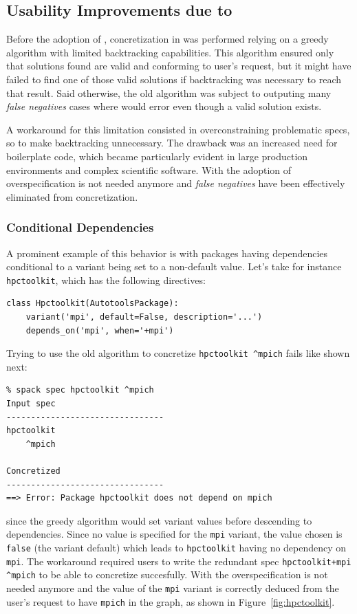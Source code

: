 \subsection{Usability Improvements due to \clingo}
Before the adoption of \clingo, concretization in \spack{} was performed relying on a greedy algorithm with limited backtracking capabilities. This algorithm ensured only that solutions found are valid and conforming to user's request, but it might have failed to find one of those valid solutions if backtracking was necessary to reach that result. Said otherwise, the old algorithm was subject to outputing many \emph{false negatives} \textemdash{} cases where \spack{} would error even though a valid solution exists.

A workaround for this limitation consisted in overconstraining problematic specs, so to make backtracking unnecessary. The drawback was an increased need for boilerplate code, which became particularly evident in large production environments and complex scientific software. With the adoption of \clingo{} overspecification is not needed anymore and \emph{false negatives} have been effectively eliminated from concretization.

\subsubsection{Conditional Dependencies}
A prominent example of this behavior is with packages having dependencies conditional to a variant being set to a non-default value. Let's take for instance \texttt{hpctoolkit}, which has the following directives:
\begin{verbatim}
class Hpctoolkit(AutotoolsPackage):
    variant('mpi', default=False, description='...')
    depends_on('mpi', when='+mpi')
\end{verbatim}
Trying to use the old algorithm to concretize \texttt{hpctoolkit \^{}mpich} fails like shown next:
\begin{verbatim}
% spack spec hpctoolkit ^mpich
Input spec
--------------------------------
hpctoolkit
    ^mpich

Concretized
--------------------------------
==> Error: Package hpctoolkit does not depend on mpich
\end{verbatim}
since the greedy algorithm would set variant values before descending to dependencies. Since no value is specified for the \texttt{mpi} variant, the value chosen is \texttt{false} (the variant default) which leads to \texttt{hpctoolkit} having no dependency on \texttt{mpi}. The workaround required users to write the redundant spec \texttt{hpctoolkit+mpi \^{}mpich} to be able to concretize succesfully. With \clingo{} the overspecification is not needed anymore and the value of the \texttt{mpi} variant is correctly deduced from the user's request to have \texttt{mpich} in the graph, as shown
in Figure~\ref{fig:hpctoolkit}.

